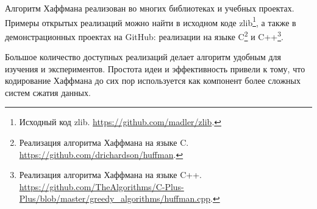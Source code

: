 \documentclass[a4paper]{article}
\begin{document}
Алгоритм Хаффмана реализован во многих библиотеках и учебных проектах. Примеры
открытых реализаций можно найти в исходном коде zlib\footnote{Исходный код
zlib. \url{https://github.com/madler/zlib}.}, а также в демонстрационных проектах на GitHub:
реализации на языке C\footnote{Реализация алгоритма Хаффмана на языке C.
\url{https://github.com/drichardson/huffman}.} и C++\footnote{Реализация алгоритма Хаффмана на
языке C++. \url{https://github.com/TheAlgorithms/C-Plus-Plus/blob/master/greedy_algorithms/huffman.cpp}.}.

Большое количество доступных реализаций делает алгоритм удобным для изучения и
экспериментов. Простота идеи и эффективность привели к тому, что кодирование
Хаффмана до сих пор используется как компонент более сложных систем сжатия
данных.
\end{document}
